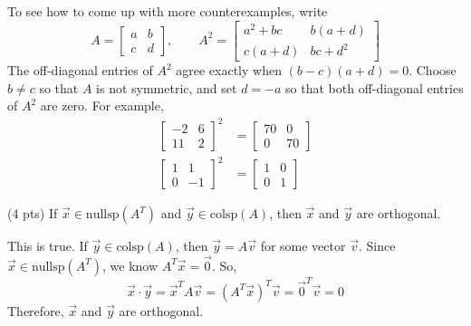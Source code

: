 \documentclass[11pt]{article}
\begin{document}
\begin{prob}[(12 pts)]
\begin{subprob}
\begin{solution}
  To see how to come up with more counterexamples, write
  \[
  A = \begin{bmatrix} a & b \\ c & d \end{bmatrix},
  \qquad
  A^2 = \begin{bmatrix}
  a^2 + bc & b(a+d) \\
  c(a+d) & bc + d^2
  \end{bmatrix}
  \]
  The off-diagonal entries of $A^2$ agree exactly when $(b-c)(a+d)=0$.
  Choose $b \ne c$ so that $A$ is not symmetric, and set $d=-a$ so that both off-diagonal entries of $A^2$ are zero. For example,
  \[
  \begin{aligned}
  \begin{bmatrix} -2 & 6 \\ 11 & 2 \end{bmatrix}^2
  &= \begin{bmatrix} 70 & 0 \\ 0 & 70 \end{bmatrix} \\[6pt]
  \begin{bmatrix} 1 & 1 \\ 0 & -1 \end{bmatrix}^2
  &= \begin{bmatrix} 1 & 0 \\ 0 & 1 \end{bmatrix}
  \end{aligned}
  \]
  \end{solution}
\end{subprob}

\begin{subprob}(4 pts) If $\vec x \in \text{nullsp}(A^T)$ and $\vec y \in \text{colsp}(A)$, then $\vec x$ and $\vec y$ are orthogonal. \\
   

  \par\noindent\emptybox{5cm}

  \begin{solution}
  This is true. If $\vec y \in \text{colsp}(A)$, then $\vec y = A\vec v$ for some vector $\vec v$. Since $\vec x \in \text{nullsp}(A^T)$, we know $A^T \vec x = \vec 0$. So,
  \[
  \vec x \cdot \vec y
  =
  \vec x^T A \vec v
  =
  (A^T \vec x)^T \vec v
  =
  \vec 0^T \vec v
  =
  0
  \]
  Therefore, $\vec x$ and $\vec y$ are orthogonal.
  \end{solution}

\end{subprob}

\end{prob}
\end{document}
